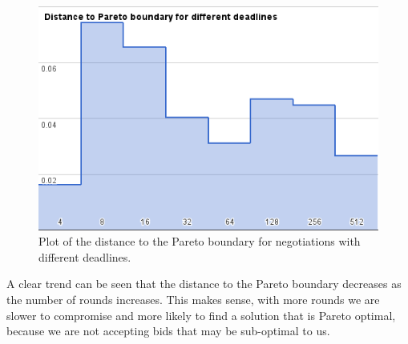 \documentclass[a4,11pt]{scrartcl}
\begin{document}
\begin{figure}[t]
    \includegraphics[width=\textwidth]{paretodeadlines.png}
    \caption{Plot of the distance to the Pareto boundary for negotiations
    with different deadlines.}
    \label{paretodeadlines}
\end{figure}

A clear trend can be seen that the distance to the Pareto boundary
decreases as the number of rounds increases. This makes sense, with more
rounds we are slower to compromise and more likely to find a solution
that is Pareto optimal, because we are not accepting bids that may be
sub-optimal to us.
\end{document}
